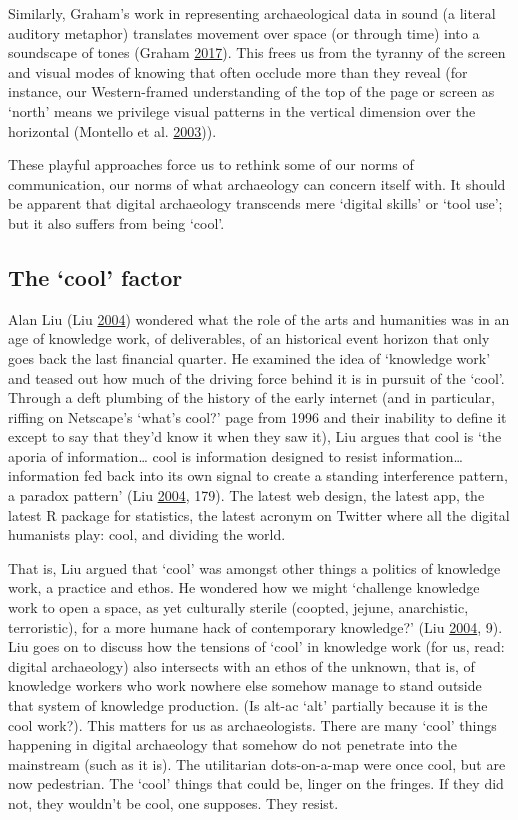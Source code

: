 \documentclass[english,]{book}
\begin{document}
Similarly, Graham's work in representing archaeological data in sound (a
literal auditory metaphor) translates movement over space (or through
time) into a soundscape of tones (Graham
\protect\hyperlink{ref-graham_cacophony_2017}{2017}). This frees us from
the tyranny of the screen and visual modes of knowing that often occlude
more than they reveal (for instance, our Western-framed understanding of
the top of the page or screen as `north' means we privilege visual
patterns in the vertical dimension over the horizontal (Montello et al.
\protect\hyperlink{ref-montello_testing_2003}{2003})).

These playful approaches force us to rethink some of our norms of
communication, our norms of what archaeology can concern itself with. It
should be apparent that digital archaeology transcends mere `digital
skills' or `tool use'; but it also suffers from being `cool'.

\subsection{\texorpdfstring{The `cool'
factor}{The cool factor}}\label{the-cool-factor}

Alan Liu (Liu \protect\hyperlink{ref-liu_laws_2004}{2004}) wondered what
the role of the arts and humanities was in an age of knowledge work, of
deliverables, of an historical event horizon that only goes back the
last financial quarter. He examined the idea of `knowledge work' and
teased out how much of the driving force behind it is in pursuit of the
`cool'. Through a deft plumbing of the history of the early internet
(and in particular, riffing on Netscape's `what's cool?' page from 1996
and their inability to define it except to say that they'd know it when
they saw it), Liu argues that cool is `the aporia of information\ldots{}
cool is information designed to resist information\ldots{} information
fed back into its own signal to create a standing interference pattern,
a paradox pattern' (Liu \protect\hyperlink{ref-liu_laws_2004}{2004},
179). The latest web design, the latest app, the latest R package for
statistics, the latest acronym on Twitter where all the digital
humanists play: cool, and dividing the world.

That is, Liu argued that `cool' was amongst other things a politics of
knowledge work, a practice and ethos. He wondered how we might
`challenge knowledge work to open a space, as yet culturally sterile
(coopted, jejune, anarchistic, terroristic), for a more humane hack of
contemporary knowledge?' (Liu
\protect\hyperlink{ref-liu_laws_2004}{2004}, 9). Liu goes on to discuss
how the tensions of `cool' in knowledge work (for us, read: digital
archaeology) also intersects with an ethos of the unknown, that is, of
knowledge workers who work nowhere else somehow manage to stand outside
that system of knowledge production. (Is alt-ac `alt' partially because
it is the cool work?). This matters for us as archaeologists. There are
many `cool' things happening in digital archaeology that somehow do not
penetrate into the mainstream (such as it is). The utilitarian
dots-on-a-map were once cool, but are now pedestrian. The `cool' things
that could be, linger on the fringes. If they did not, they wouldn't be
cool, one supposes. They resist.
\end{document}
